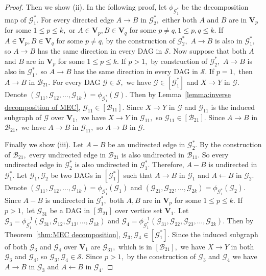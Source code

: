\documentclass{article}
\begin{document}
\begin{proof}
Then we show (ii). In the following proof, let $\phi_{\mathcal{G}^*_1}$ be the decomposition map of $\mathcal{G}^*_1.$ For every directed edge $A\to B$ in $\mathcal{G}^*_2,$ either both $A$ and $B$ are in $\mathbf{V}_p$ for some $1\le p \le k, $ or $A\in \mathbf{V}_p,B\in \mathbf{V}_q$ for some $p\ne q,1\le p,q\le k.$ If $A\in \mathbf{V}_p,B\in \mathbf{V}_q$ for some $p\ne q$, by the construction of $\mathcal{G}^*_2,$ $A\to B$ is also in $\mathcal{G}^*_1,$ so $A\to B$ has the same direction in every DAG in $\mathcal{S}.$ Now suppose that both $A$ and $B$ are in $\mathbf{V}_p$ for some $1\le p \le k.$ If $p > 1,$ by construction of $\mathcal{G}^*_2,$ $A\to B$ is also in $\mathcal{G}^*_1,$ so $A\to B$ has the same direction in every DAG in $\mathcal{S}.$ If $p=1,$ then $A\to B$ in $\mathcal{B}_{21}.$ For every DAG $\mathcal{G}\in \mathcal{S},$ we have $\mathcal{G}\in [\mathcal{G}^*_1]$ and $X\to Y$ in $\mathcal{G}.$ Denote $(\mathcal{G}_{11},\mathcal{G}_{12},\dots,\mathcal{G}_{1k})=\phi_{\mathcal{G}^*_1}(\mathcal{G}).$ Then by Lemma~\ref{lemma:inverse decomposition of MEC}, $\mathcal{G}_{11}\in [\mathcal{B}_{11}].$ Since $X\to Y$ in $\mathcal{G}$ and $\mathcal{G}_{11}$ is the induced subgraph of $\mathcal{G}$ over $\mathbf{V}_1,$ we have $X\to Y$ in $\mathcal{G}_{11},$ so $\mathcal{G}_{11}\in [\mathcal{B}_{21}].$ Since $A\to B$ in $\mathcal{B}_{21},$ we have $A\to B$ in $\mathcal{G}_{11},$ so $A\to B$ in $\mathcal{G}.$

Finally we show (iii). Let $A-B$ be an undirected edge in $\mathcal{G}^*_2.$ By the construction of $\mathcal{B}_{21},$ every undirected edge in $\mathcal{B}_{21}$ is also undirected in $\mathcal{B}_{11}.$ So every undirected edge in $\mathcal{G}^*_2$ is also undirected in $\mathcal{G}^*_1.$ Therefore, $A-B$ is undirected in $\mathcal{G}^*_1.$ Let $\mathcal{G}_1,\mathcal{G}_2$ be two DAGs in $[\mathcal{G}^*_1]$ such that $A\to B$ in $\mathcal{G}_1$ and $A\leftarrow B$ in $\mathcal{G}_2.$ Denote $(\mathcal{G}_{11},\mathcal{G}_{12},\dots,\mathcal{G}_{1k})=\phi_{\mathcal{G}^*_1}(\mathcal{G}_1)$ and $(\mathcal{G}_{21},\mathcal{G}_{22},\dots,\mathcal{G}_{2k})=\phi_{\mathcal{G}^*_1}(\mathcal{G}_2).$ 
Since $A-B$ is undirected in $\mathcal{G}^*_1,$ both $A,B$ are in $\mathbf{V}_p$ for some $1\le p\le k.$ If $p > 1,$ let $\mathcal{G}_{31}$ be a DAG in $[\mathcal{B}_{21}]$ over vertice set $\mathbf{V}_1.$ Let $\mathcal{G}_3=\phi^{-1}_{\mathcal{G}^*_1}(\mathcal{G}_{31},\mathcal{G}_{12},\mathcal{G}_{13},\dots,\mathcal{G}_{1k})$ and $\mathcal{G}_4=\phi^{-1}_{\mathcal{G}^*_1}(\mathcal{G}_{31},\mathcal{G}_{22},\mathcal{G}_{23},\dots,\mathcal{G}_{2k}).$ Then by Theorem~\ref{thm:MEC decomposition}, $\mathcal{G}_3,\mathcal{G}_4\in [\mathcal{G}^*_1].$ Since the induced subgraph of both $\mathcal{G}_3$ and $\mathcal{G}_4$ over $\mathbf{V}_1$ are $\mathcal{G}_{31},$ which is in $[\mathcal{B}_{21}],$ we have $X\to Y$ in both $\mathcal{G}_3$ and $\mathcal{G}_4$, so $\mathcal{G}_3,\mathcal{G}_4\in \mathcal{S}.$ Since $p>1,$ by the construction of $\mathcal{G}_3$ and $\mathcal{G}_4$ we have $A\to B$ in $\mathcal{G}_3$ and $A\leftarrow B$ in $\mathcal{G}_4.$


\end{proof}
\end{document}
